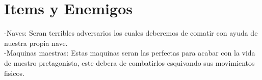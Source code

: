 \documentclass{article}
\begin{document}
\section{Items y Enemigos} \label{conclulsion}

-Naves: Seran terribles adversarios los cuales deberemos de comatir con ayuda de nuestra propia nave.\\
-Maquinas maestras: Estas maquinas seran las perfectas para acabar con la vida de nuestro pretagonista, este debera de combatirlos esquivando sus movimientos fisicos.
\end{document}

